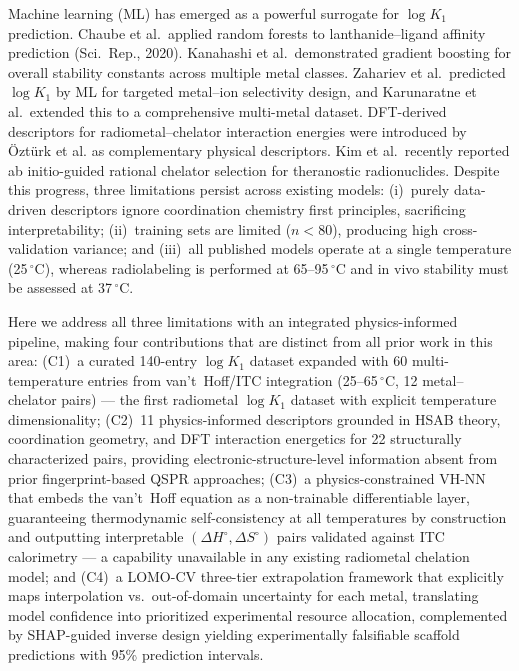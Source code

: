\documentclass[journal=jacsat,manuscript=article]{achemso}
\begin{document}
Machine learning (ML) has emerged as a powerful surrogate for $\log K_1$ prediction.
Chaube et al.\ applied random forests to lanthanide--ligand affinity prediction
(Sci.\ Rep., 2020).\cite{Chaube2020}
Kanahashi et al.\ demonstrated gradient boosting for overall stability constants across
multiple metal classes.\cite{Kanahashi2022}
Zahariev et al.\ predicted $\log K_1$ by ML for targeted metal--ion selectivity
design,\cite{Zahariev2024} and Karunaratne et al.\ extended this to a comprehensive
multi-metal dataset.\cite{Karunaratne2025}
DFT-derived descriptors for radiometal--chelator interaction energies were introduced
by \"{O}zt\"{u}rk et al.\cite{Ozturk2024} as complementary physical descriptors.
Kim et al.\ recently reported ab initio-guided rational chelator selection for
theranostic radionuclides.\cite{Kim2026molpharm}
Despite this progress, three limitations persist across existing models:
(i)~purely data-driven descriptors ignore coordination chemistry first principles,
sacrificing interpretability;\cite{Kanahashi2022,Zahariev2024}
(ii)~training sets are limited ($n < 80$), producing high cross-validation variance;
and (iii)~all published models operate at a single temperature (25\,$^\circ$C),
whereas radiolabeling is performed at 65--95\,$^\circ$C and in vivo stability
must be assessed at 37\,$^\circ$C.\cite{Boros2019,Morgan2023}

Here we address all three limitations with an integrated physics-informed pipeline,
making four contributions that are distinct from all prior work in this
area:\cite{Karunaratne2025,Ozturk2024,Chaube2020,Kanahashi2022}
(C1)~a curated 140-entry $\log K_1$ dataset expanded with 60 multi-temperature
entries from van't~Hoff/ITC integration (25--65\,$^\circ$C, 12 metal--chelator pairs)
--- the first radiometal $\log K_1$ dataset with explicit temperature dimensionality;
(C2)~11 physics-informed descriptors grounded in HSAB theory,\cite{Pearson1963,Parr1983}
coordination geometry,\cite{Shannon1976,Hancock1989} and DFT interaction
energetics\cite{Becke1993,LeeYangParr1988,Weigend2005,Grimme2010,Barone1998,Neese2020}
for 22 structurally characterized pairs, providing electronic-structure-level
information absent from prior fingerprint-based QSPR approaches;
(C3)~a physics-constrained VH-NN that embeds the van't~Hoff equation as a
non-trainable differentiable layer, guaranteeing thermodynamic self-consistency at all
temperatures by construction and outputting interpretable $(\Delta H^\circ, \Delta S^\circ)$
pairs validated against ITC calorimetry --- a capability unavailable in any
existing radiometal chelation model; and
(C4)~a LOMO-CV three-tier extrapolation framework\cite{Lookman2019} that
explicitly maps interpolation vs.\ out-of-domain uncertainty for each metal,
translating model confidence into prioritized experimental resource allocation,
complemented by SHAP-guided inverse design\cite{Lundberg2017,Lundberg2020}
yielding experimentally falsifiable scaffold predictions with 95\% prediction intervals.
\end{document}
